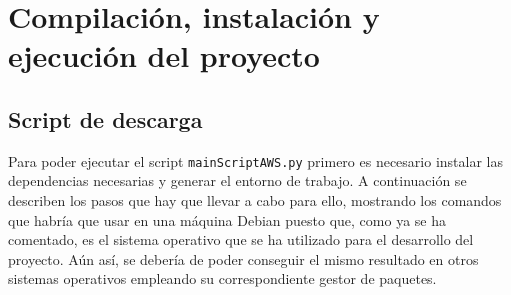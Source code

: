 \section{Compilación, instalación y ejecución del proyecto}

\subsection{Script de descarga}

Para poder ejecutar el script \texttt{mainScriptAWS.py} primero es necesario instalar las dependencias necesarias y generar el entorno de trabajo. A continuación se describen los pasos que hay que llevar a cabo para ello, mostrando los comandos que habría que usar en una máquina Debian puesto que, como ya se ha comentado, es el sistema operativo que se ha utilizado para el desarrollo del proyecto. Aún así, se debería de poder conseguir el mismo resultado en otros sistemas operativos empleando su correspondiente gestor de paquetes.


